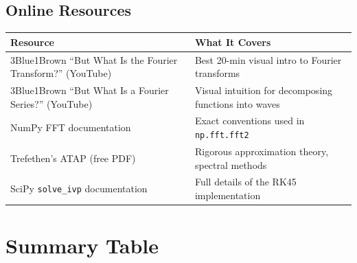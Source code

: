 \documentclass[12pt,a4paper]{article}
\newcommand{\code}[1]{\texttt{#1}}
\theoremstyle{definition}
\begin{document}
\subsection*{Online Resources}

\begin{center}
\begin{tabular}{ll}
  \toprule
  Resource & What It Covers \\
  \midrule
  3Blue1Brown ``But What Is the Fourier Transform?'' (YouTube)
    & Best 20-min visual intro to Fourier transforms \\
  3Blue1Brown ``But What Is a Fourier Series?'' (YouTube)
    & Visual intuition for decomposing functions into waves \\
  NumPy FFT documentation
    & Exact conventions used in \code{np.fft.fft2} \\
  Trefethen's ATAP (free PDF)
    & Rigorous approximation theory, spectral methods \\
  SciPy \code{solve\_ivp} documentation
    & Full details of the RK45 implementation \\
  \bottomrule
\end{tabular}
\end{center}

\section{Summary Table}
\end{document}
